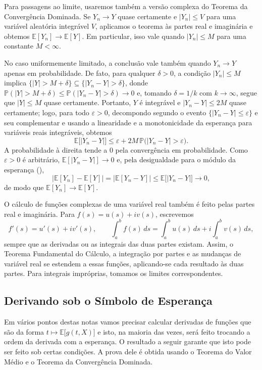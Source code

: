 \documentclass[12pt,portuguese]{article}
\theoremstyle{definition}
\theoremstyle{plainexercise}
\theoremstyle{starredexercise}
\theoremstyle{definition}
\begin{document}
Para passagens ao limite, usaremos também a versão complexa do Teorema da
Convergência Dominada. Se $Y_n\to Y$ quase certamente e $|Y_n|\leqslant V$
para uma variável aleatória integrável $V$, aplicamos o teorema às partes real
e imaginária e obtemos $\mathbb{E}[Y_n]\to\mathbb{E}[Y]$. Em particular, isso
vale quando $|Y_n|\leqslant M$ para uma constante $M<\infty$.

No caso uniformemente limitado, a conclusão vale também quando $Y_n\to Y$
apenas em probabilidade. De fato, para qualquer $\delta>0$, a condição
$|Y_n|\leqslant M$ implica $\{|Y|>M+\delta\}\subseteq\{|Y_n-Y|>\delta\}$, donde
$\mathbb{P}(|Y|>M+\delta)\leqslant\mathbb{P}(|Y_n-Y|>\delta)\to 0$ e, tomando
$\delta=1/k$ com $k\to\infty$, segue que $|Y|\leqslant M$ quase certamente.
Portanto, $Y$ é integrável e $|Y_n-Y|\leqslant 2M$ quase certamente; logo, para
todo $\varepsilon>0$, decompondo segundo o evento
$\{|Y_n-Y|\leqslant\varepsilon\}$ e seu complementar e usando a linearidade e a
monotonicidade da esperança para variáveis reais integráveis, obtemos
\[
\mathbb{E}\bigl[|Y_n-Y|\bigr]
\leqslant
\varepsilon+2M\,\mathbb{P}\bigl(|Y_n-Y|>\varepsilon\bigr).
\]
A probabilidade à direita tende a $0$ pela convergência em probabilidade.
Como $\varepsilon>0$ é arbitrário,
$\mathbb{E}[|Y_n-Y|]\to0$ e, pela desigualdade para o módulo da esperança
(),
\[
\bigl|\mathbb{E}[Y_n]-\mathbb{E}[Y]\bigr|
=\bigl|\mathbb{E}[Y_n-Y]\bigr|
\leqslant\mathbb{E}\bigl[|Y_n-Y|\bigr]\longrightarrow0,
\]
de modo que $\mathbb{E}[Y_n]\to\mathbb{E}[Y]$.

O cálculo de funções complexas de uma variável real também é feito pelas
partes real e imaginária. Para $f(s)=u(s)+iv(s)$, escrevemos
\[
f'(s)=u'(s)+iv'(s),
\qquad
\int_a^b f(s)\,ds=\int_a^b u(s)\,ds+i\int_a^b v(s)\,ds,
\]
sempre que as derivadas ou as integrais das duas partes existam. Assim, o
Teorema Fundamental do Cálculo, a integração por partes e as mudanças de
variável real se estendem a essas funções, aplicando-se cada resultado às
duas partes. Para integrais impróprias, tomamos os limites correspondentes.

\subsection{Derivando sob o Símbolo de Esperança}\label{subsec:derivacao-integral}

Em vários pontos destas notas vamos precisar calcular derivadas de funções que são da forma
$t\mapsto\mathbb{E}\bigl[g(t,X)\bigr]$ e isto, na maioria das vezes, será
feito trocando a ordem da derivada com a esperança. O resultado a seguir
garante que isto pode ser feito sob certas condições. A prova dele é obtida
usando o Teorema do Valor Médio e o Teorema da Convergência Dominada.
\end{document}

